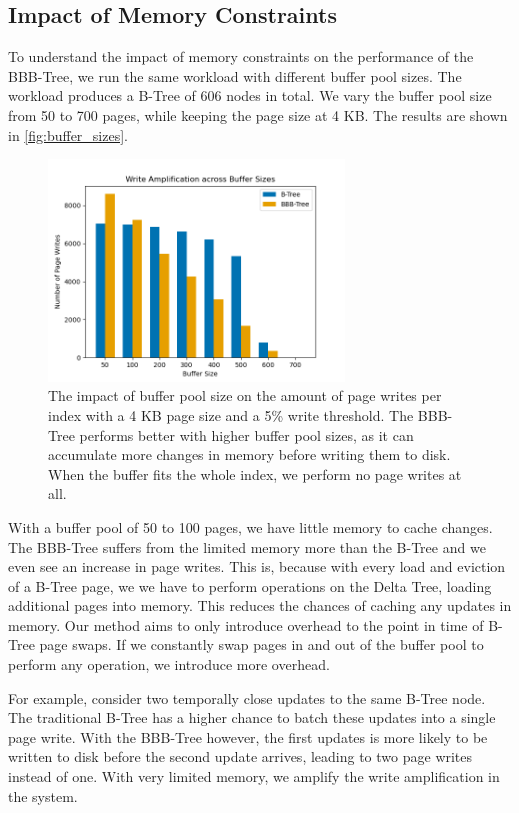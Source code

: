 \subsection*{Impact of Memory Constraints}
To understand the impact of memory constraints on the performance of the BBB-Tree, we run the same workload with different buffer pool sizes.
The workload produces a B-Tree of 606 nodes in total. We vary the buffer pool size from 50 to 700 pages, while keeping the page size at 4 KB.
The results are shown in \autoref{fig:buffer_sizes}.

\begin{figure}[htbp]
  \centering
  \includegraphics[width=0.7\textwidth]{figures/evaluation/pageviews_buffer_sizes.png}
  \caption{The impact of buffer pool size on the amount of page writes per index with a 4 KB page size and a 5\% write threshold. The BBB-Tree performs better with higher buffer pool sizes, as it can accumulate more changes in memory before writing them to disk. When the buffer fits the whole index, we perform no page writes at all.}
  \label{fig:buffer_sizes}
\end{figure}

With a buffer pool of 50 to 100 pages, we have little memory to cache changes.
The BBB-Tree suffers from the limited memory more than the B-Tree and we even see an increase in page writes.
This is, because with every load and eviction of a B-Tree page, we we have to perform operations on the Delta Tree, loading additional pages into memory.
This reduces the chances of caching any updates in memory.
Our method aims to only introduce overhead to the point in time of B-Tree page swaps.
If we constantly swap pages in and out of the buffer pool to perform any operation, we introduce more overhead.

For example, consider two temporally close updates to the same B-Tree node. 
The traditional B-Tree has a higher chance to batch these updates into a single page write.
With the BBB-Tree however, the first updates is more likely to be written to disk before the second update arrives, leading to two page writes instead of one.
With very limited memory, we amplify the write amplification in the system.


